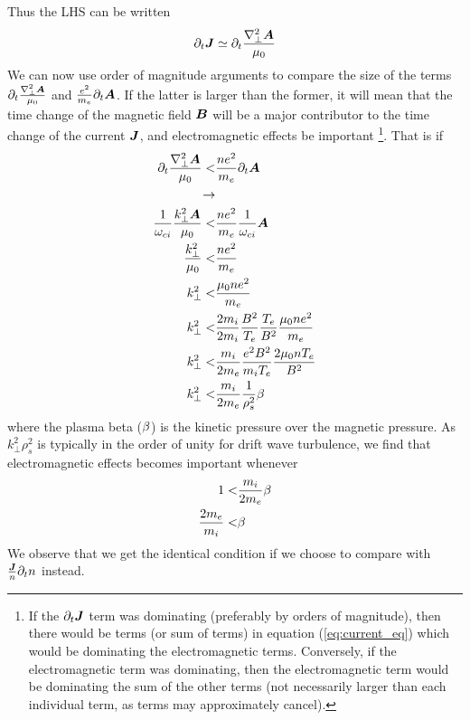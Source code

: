 %
Thus the LHS can be written
%
\begin{align*}
    \partial_t \boldsymbol{J} \simeq \partial_t \frac{\nabla^2_\perp\boldsymbol{A}}{\mu_0}
\end{align*}
%
We can now use order of magnitude arguments to compare the size of the terms
$\partial_t \frac{\nabla^2_\perp\boldsymbol{A}}{\mu_0}$ and $\frac{e^2}{m_e}\partial_t
\boldsymbol{A}$. If the latter is larger than the former, it will mean that the time
change of the magnetic field $\boldsymbol{B}$ will be a major contributor to the time
change of the current $\boldsymbol{J}$, and electromagnetic effects be important%
%
\footnote{
    If the $\partial_t \boldsymbol{J}$ term was dominating (preferably by orders of
    magnitude), then there would be terms (or sum of terms) in equation (\ref{eq:current_eq})
    which would be dominating the electromagnetic terms.
    Conversely, if the electromagnetic term was dominating, then the
    electromagnetic term would be dominating the sum of the other terms (not
    necessarily larger than each individual term, as terms may approximately
    cancel).
}.%
%
That is if
%
\begin{align*}
    \partial_t \frac{\nabla^2_\perp\boldsymbol{A}}{\mu_0}
    < &
    \frac{ne^2}{m_e}\partial_t \boldsymbol{A}
    \\
    \rightarrow &
    \\
    \frac{1}{\omega_{ci}} \frac{k_\perp^2\boldsymbol{A}}{\mu_0}
    < &
    \frac{ne^2}{m_e}\frac{1}{\omega_{ci}} \boldsymbol{A}
    \\
    \frac{k_\perp^2}{\mu_0}
    < &
    \frac{ne^2}{m_e}
    \\
    k_\perp^2
    < &
    \frac{\mu_0ne^2}{m_e}
    \\
    k_\perp^2
    < &
    \frac{2m_i}{2m_i}\frac{B^2}{T_e}\frac{T_e}{B^2}\frac{\mu_0ne^2}{m_e}
    \\
    k_\perp^2
    < &
    \frac{m_i}{2m_e}\frac{e^2B^2}{m_iT_e}\frac{2\mu_0nT_e}{B^2}
    \\
    k_\perp^2
    < &
    \frac{m_i}{2m_e}\frac{1}{\rho_s^2}\beta
\end{align*}
%
where the plasma beta ($\beta$) is the kinetic pressure over the magnetic
pressure. As
$ k_\perp^2\rho_s^2$ is typically in the order of unity for drift wave
turbulence, we find that electromagnetic effects becomes important whenever
%
\begin{align*}
    1
    < &
    \frac{m_i}{2m_e}\beta
    \\
    \frac{2m_e}{m_i}
    < &
    \beta
\end{align*}
%
We observe that we get the identical condition if we choose to compare with
$\frac{\boldsymbol{J}}{n}\partial_t n$ instead.
